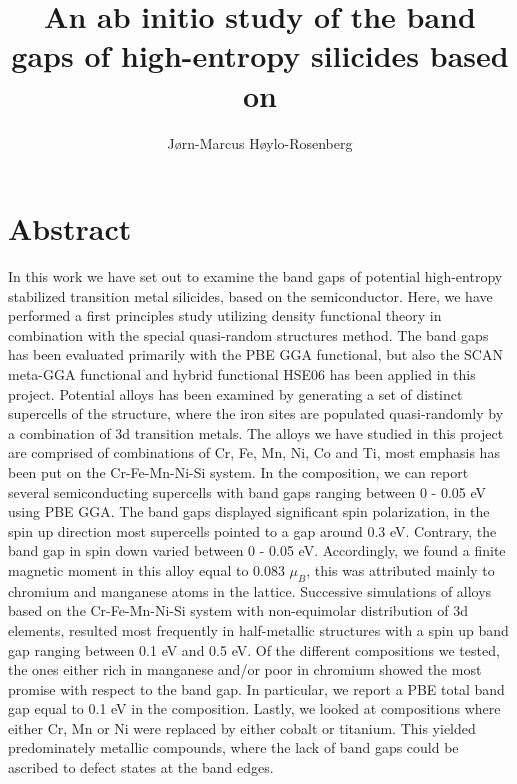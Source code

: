 \documentclass[UKenglish]{ifimaster}  %
\title{An ab initio study of the band gaps of high-entropy silicides based on \ch{FeSi2}}        %
\author{Jørn-Marcus Høylo-Rosenberg}                      %
\begin{document}
\duoforside[dept={Department of Chemistry},   %
  program={Materials Science for Energy and Nanotechnology},  %
  long]                                        %

\frontmatter{}  

\chapter*{Abstract}                   %

In this work we have set out to examine the band gaps of potential high-entropy stabilized transition metal silicides, based on the  semiconductor. Here, we have performed a first principles study utilizing density functional theory in combination with the special quasi-random structures method. The band gaps has been evaluated primarily with the PBE GGA functional, but also the SCAN meta-GGA functional and hybrid functional HSE06 has been applied in this project. Potential alloys has been examined by generating a set of distinct supercells of the  structure, where the iron sites are populated quasi-randomly by a combination of 3d transition metals. The alloys we have studied in this project are comprised of combinations of Cr, Fe, Mn, Ni, Co and Ti, most emphasis has been put on the Cr-Fe-Mn-Ni-Si system. In the  composition, we can report several semiconducting supercells with band gaps ranging between 0 - 0.05 eV using PBE GGA. The band gaps displayed significant spin polarization, in the spin up direction most supercells pointed to a gap around 0.3 eV. Contrary, the band gap in spin down varied between 0 - 0.05 eV. Accordingly, we found a finite magnetic moment in this alloy equal to 0.083 $\mu_B$, this was attributed mainly to chromium and manganese atoms in the lattice. Successive simulations of alloys based on the Cr-Fe-Mn-Ni-Si system with non-equimolar distribution of 3d elements, resulted most frequently in half-metallic structures with a spin up band gap ranging between 0.1 eV and 0.5 eV. Of the different compositions we tested, the ones either rich in manganese and/or poor in chromium showed the most promise with respect to the band gap. In particular, we report a PBE total band gap equal to 0.1 eV in the  composition. Lastly, we looked at compositions where either Cr, Mn or Ni were replaced by either cobalt or titanium. This yielded predominately metallic compounds, where the lack of band gaps could be ascribed to defect states at the band edges. 
\end{document}
